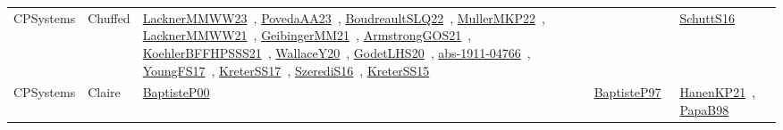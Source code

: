 {\begin{longtable}{lp{3cm}>{\raggedright\arraybackslash}p{6cm}>{\raggedright\arraybackslash}p{6cm}>{\raggedright\arraybackslash}p{8cm}}
CPSystems & Chuffed & \href{articles/LacknerMMWW23.pdf}{LacknerMMWW23}~\cite{LacknerMMWW23}, \href{papers/PovedaAA23.pdf}{PovedaAA23}~\cite{PovedaAA23}, \href{papers/BoudreaultSLQ22.pdf}{BoudreaultSLQ22}~\cite{BoudreaultSLQ22}, \href{articles/MullerMKP22.pdf}{MullerMKP22}~\cite{MullerMKP22}, \href{papers/LacknerMMWW21.pdf}{LacknerMMWW21}~\cite{LacknerMMWW21}, \href{papers/GeibingerMM21.pdf}{GeibingerMM21}~\cite{GeibingerMM21}, \href{papers/ArmstrongGOS21.pdf}{ArmstrongGOS21}~\cite{ArmstrongGOS21}, \href{articles/KoehlerBFFHPSSS21.pdf}{KoehlerBFFHPSSS21}~\cite{KoehlerBFFHPSSS21}, \href{articles/WallaceY20.pdf}{WallaceY20}~\cite{WallaceY20}, \href{papers/GodetLHS20.pdf}{GodetLHS20}~\cite{GodetLHS20}, \href{articles/abs-1911-04766.pdf}{abs-1911-04766}~\cite{abs-1911-04766}, \href{papers/YoungFS17.pdf}{YoungFS17}~\cite{YoungFS17}, \href{articles/KreterSS17.pdf}{KreterSS17}~\cite{KreterSS17}, \href{papers/SzerediS16.pdf}{SzerediS16}~\cite{SzerediS16}, \href{papers/KreterSS15.pdf}{KreterSS15}~\cite{KreterSS15} &  & \href{papers/SchuttS16.pdf}{SchuttS16}~\cite{SchuttS16}\\
CPSystems & Claire & \href{articles/BaptisteP00.pdf}{BaptisteP00}~\cite{BaptisteP00} & \href{papers/BaptisteP97.pdf}{BaptisteP97}~\cite{BaptisteP97} & \href{papers/HanenKP21.pdf}{HanenKP21}~\cite{HanenKP21}, \href{articles/PapaB98.pdf}{PapaB98}~\cite{PapaB98}\\

\end{longtable}}
